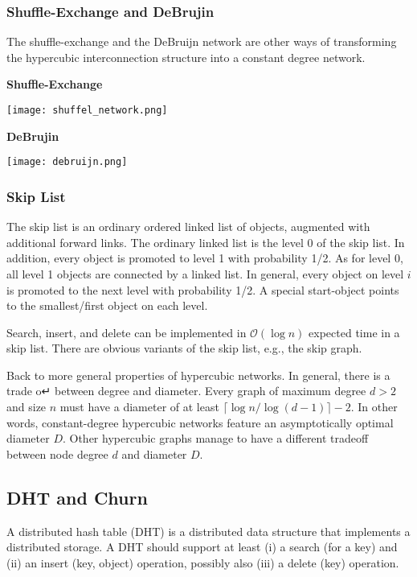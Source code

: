 \subsubsection{Shuffle-Exchange and DeBrujin}

The shuffle-exchange and the DeBruijn network are other ways of transforming the hypercubic interconnection structure into a constant degree network. \medskip

\textbf{Shuffle-Exchange}
\begin{center}
	\texttt{[image: shuffel\_network.png]}
\end{center}

\textbf{DeBrujin}
\begin{center}
	\texttt{[image: debruijn.png]}
\end{center}

\subsubsection{Skip List}

The skip list is an ordinary ordered linked list of objects, augmented with additional forward links. The ordinary linked list is the level 0 of the skip list. In addition, every object is promoted to level 1 with probability 1/2. As for level 0, all level 1 objects are connected by a linked list. In general, every object on level $i$ is promoted to the next level with probability 1/2. A special start-object points to the smallest/first object on each level. \medskip

Search, insert, and delete can be implemented in $\mathcal{O}(\log n)$ expected time in a skip list. There are obvious variants of the skip list, e.g., the skip graph. \medskip

Back to more general properties of hypercubic networks. In general, there is a trade o↵ between degree and diameter. Every graph of maximum degree $d > 2$ and size $n$ must have a diameter of at least $\lceil \log n / \log (d-1) \rceil -2$. In other words, constant-degree hypercubic networks feature an asymptotically optimal diameter $D$. Other hypercubic graphs manage to have a different tradeoff between node degree $d$ and diameter $D$.


\subsection{DHT and Churn}

A distributed hash table (DHT) is a distributed data structure that implements a distributed storage. A DHT should support at least (i) a search (for a key) and (ii) an insert (key, object) operation, possibly also (iii) a delete (key) operation. \medskip

